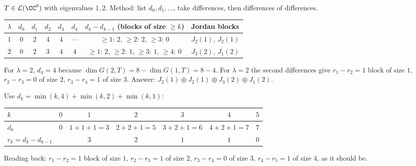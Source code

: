 \documentclass[10pt]{scrartcl}
\newcommand{\LL}{\mathcal L}\newcommand{\PP}{\mathcal P}\newcommand{\MM}{\mathcal M}
\begin{document}
\begin{example*}
  $T\in\LL(\CC^8)$ with eigenvalues $1,2$. Method: list $d_0,d_1,\dots$, take differences, then differences of differences.
  \begin{center}
  \renewcommand{\arraystretch}{1.22}
  \begin{tabular}{@{}cccccccl@{}}
    \toprule
    $\lambda$ & $d_0$ & $d_1$ & $d_2$ & $d_3$ & $d_4$ & $d_k - d_{k-1}$ (blocks of size $\ge k$) & Jordan blocks \\
    \midrule
    $1$ & $0$ & $2$ & $4$ & $4$ & --- & $\ge 1$: $2$,\;\; $\ge 2$: $2$,\;\; $\ge 3$: $0$ & $J_2(1),\, J_2(1)$ \\
    $2$ & $0$ & $2$ & $3$ & $4$ & $4$ & $\ge 1$: $2$,\;\; $\ge 2$: $1$,\;\; $\ge 3$: $1$,\;\; $\ge 4$: $0$ & $J_3(2),\, J_1(2)$ \\
    \bottomrule
  \end{tabular}
  \end{center}
  For $\lambda=2$, $d_4=4$ because $\dim G(2,T)=8-\dim G(1,T)=8-4$. For $\lambda=2$ the second differences give $r_1-r_2=1$ block of size $1$, $r_2-r_3=0$ of size $2$, $r_3-r_4=1$ of size $3$. Answer: $J_2(1)\oplus J_2(1)\oplus J_3(2)\oplus J_1(2)$.
\end{example*}

\begin{example*}
  Use $d_k=\min(k,4)+\min(k,2)+\min(k,1)$:
  \begin{center}
  \begin{tabular}{@{}lcccccc@{}}
    \toprule
    $k$ & $0$ & $1$ & $2$ & $3$ & $4$ & $5$\\
    \midrule
    $d_k$ & $0$ & $1+1+1=3$ & $2+2+1=5$ & $3+2+1=6$ & $4+2+1=7$ & $7$\\
    $r_k=d_k-d_{k-1}$ & & $3$ & $2$ & $1$ & $1$ & $0$\\
    \bottomrule
  \end{tabular}
  \end{center}
  Reading back: $r_1-r_2=1$ block of size $1$, $r_2-r_3=1$ of size $2$, $r_3-r_4=0$ of size $3$, $r_4-r_5=1$ of size $4$, as it should be.
\end{example*}
\end{document}
